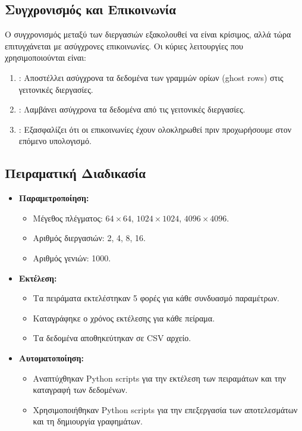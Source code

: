 \documentclass{article}
\begin{document}
\subsection*{Συγχρονισμός και Επικοινωνία}
Ο συγχρονισμός μεταξύ των διεργασιών εξακολουθεί να είναι κρίσιμος, αλλά τώρα επιτυγχάνεται με ασύγχρονες επικοινωνίες. Οι κύριες λειτουργίες που χρησιμοποιούνται είναι:
\begin{enumerate}
    \item \textbf{\texttt{}}: Αποστέλλει ασύγχρονα τα δεδομένα των γραμμών ορίων (ghost rows) στις γειτονικές διεργασίες.
    \item \textbf{\texttt{}}: Λαμβάνει ασύγχρονα τα δεδομένα από τις γειτονικές διεργασίες.
    \item \textbf{\texttt{}}: Εξασφαλίζει ότι οι επικοινωνίες έχουν ολοκληρωθεί πριν προχωρήσουμε στον επόμενο υπολογισμό.
\end{enumerate}
\subsection*{Πειραματική Διαδικασία}
\begin{itemize}
    \item \textbf{Παραμετροποίηση:}
    \begin{itemize}
        \item Μέγεθος πλέγματος: $64 \times 64$, $1024 \times 1024$, $4096 \times 4096$.
        \item Αριθμός διεργασιών: 2, 4, 8, 16.
        \item Αριθμός γενιών: 1000.
    \end{itemize}
    \item \textbf{Εκτέλεση:}
    \begin{itemize}
        \item Τα πειράματα εκτελέστηκαν 5 φορές για κάθε συνδυασμό παραμέτρων.
        \item Καταγράφηκε ο χρόνος εκτέλεσης για κάθε πείραμα.
        \item Τα δεδομένα αποθηκεύτηκαν σε CSV αρχείο.
    \end{itemize}
    \item \textbf{Αυτοματοποίηση:}
    \begin{itemize}
        \item Αναπτύχθηκαν Python scripts για την εκτέλεση των πειραμάτων και την καταγραφή των δεδομένων.
        \item Χρησιμοποιήθηκαν Python scripts για την επεξεργασία των αποτελεσμάτων και τη δημιουργία γραφημάτων.
    \end{itemize}
\end{itemize}
\end{document}
